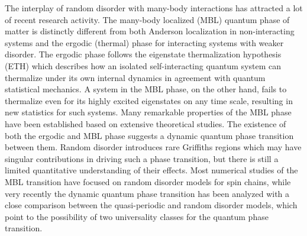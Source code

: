 \documentclass[prl,aps,epsf,showpacs,twocolumn,letterpaper]{revtex4}
\begin{document}
The interplay of random disorder with many-body interactions has attracted a lot of recent research activity\cite{basko2006, oganesyan2007, pal2010, znidaric2008, huse2013, nandkishore2015, altman2015, huse2014, nandkishore2014, pekker_hilbert2014}.  The many-body localized (MBL) quantum phase\cite{nandkishore2015, altman2015, huse2014, nandkishore2014, pekker_hilbert2014} of matter is distinctly different from both Anderson localization in non-interacting systems and the ergodic (thermal) phase for interacting systems with weaker disorder.  The ergodic phase follows the  eigenstate thermalization hypothesis (ETH) which describes how an isolated self-interacting quantum system can thermalize under its own internal dynamics in agreement with quantum statistical mechanics\cite{deutsch1991, srednicki1994, rigol2008}.  A system in the MBL phase, on the other hand, fails to thermalize even for its highly excited eigenstates on any time scale, resulting in new statistics for such systems\cite{basko2006, oganesyan2007, pal2010, znidaric2008, huse2013, nandkishore2015, altman2015, huse2014, nandkishore2014, pekker_hilbert2014}.  Many remarkable properties of the MBL phase have been established\cite{nandkishore2015, altman2015, huse2013, nandkishore2014, oganesyan2007, pal2010, znidaric2008, rigol2008, serbyn2014, kwasigroch2014, yao2014, vasseur2015, huse2014, serbyn2013, ros2015, chandran2014, grover2014, agarwal2015, knap2015, luitz2015, devakul2015, torres2015, canovi2011, cuevas2012, bauer2013, kjall2014, luca2013, iyer2013, pekker_hilbert2014, johri2014, bardarson2012, andraschko2014, laumann2014, hickey2014, nanduri2014, barlev2014, imbrie2014, groverf2014, ponte2015, huang2015, you2015, serbyn2015, singh2015, barlev2015, deng2015, chen2015} based on extensive theoretical studies.  The existence of both the ergodic and MBL phase suggests a dynamic quantum phase transition between them\cite{basko2006, pal2010, oganesyan2007, kjall2014, vosk_theory2014, potter2015trans, serbyn2015, agarwal2015, knap2015, lim2016, zhang2016, zhang2016a, yu2016, vedika2016, dumitrescu2017}.  Random disorder introduces rare Griffiths regions\cite{vosk_theory2014, potter2015trans, knap2015,luitz2015,lim2016} which may have singular contributions in driving such a phase transition, but there is still a limited quantitative understanding of their effects\cite{vedika2017}.  Most numerical studies of the MBL transition have focused on random disorder models for spin chains\cite{pal2010, kjall2014, luitz2015, yu2016, vedika2016}, while very recently the dynamic quantum phase transition has been analyzed with a close comparison between the quasi-periodic and random disorder models, which point to the possibility of two universality classes for the quantum phase transition\cite{vedika2017, vedika2016}.
\end{document}
